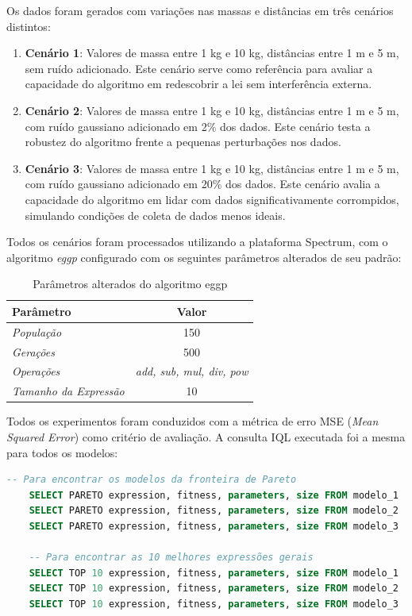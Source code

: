 Os dados foram gerados com variações nas massas e distâncias em três cenários distintos:
\begin{enumerate}
    \item \textbf{Cenário 1}: Valores de massa entre 1 kg e 10 kg, distâncias entre 1 m e 5 m, sem ruído adicionado. Este cenário serve como referência para avaliar a capacidade do algoritmo em redescobrir a lei sem interferência externa.
    \item \textbf{Cenário 2}: Valores de massa entre 1 kg e 10 kg, distâncias entre 1 m e 5 m, com ruído gaussiano adicionado em 2\% dos dados. Este cenário testa a robustez do algoritmo frente a pequenas perturbações nos dados.
    \item \textbf{Cenário 3}: Valores de massa entre 1 kg e 10 kg, distâncias entre 1 m e 5 m, com ruído gaussiano adicionado em 20\% dos dados. Este cenário avalia a capacidade do algoritmo em lidar com dados significativamente corrompidos, simulando condições de coleta de dados menos ideais.
\end{enumerate}

Todos os cenários foram processados utilizando a plataforma Spectrum, com o algoritmo \textit{eggp} configurado com os seguintes parâmetros alterados de seu padrão:
\begin{table}
    \centering
    \caption{Parâmetros alterados do algoritmo eggp}
    \label{tab:eggp_parameters}
    \begin{tabular}{lc}
        \toprule
        \textbf{Parâmetro} & \textbf{Valor} \\
        \midrule
        \textit{População} & 150 \\
        \textit{Gerações} & 500 \\
        \textit{Operações} & \textit{add, sub, mul, div, pow} \\
        \textit{Tamanho da Expressão} & 10 \\
    \end{tabular}
\end{table}

Todos os experimentos foram conduzidos com a métrica de erro MSE (\textit{Mean Squared Error}) como critério de avaliação. A consulta IQL executada foi a mesma para todos os modelos:
\begin{lstlisting}[language=SQL]
    -- Para encontrar os modelos da fronteira de Pareto
    SELECT PARETO expression, fitness, parameters, size FROM modelo_1
    SELECT PARETO expression, fitness, parameters, size FROM modelo_2
    SELECT PARETO expression, fitness, parameters, size FROM modelo_3

    -- Para encontrar as 10 melhores expressões gerais
    SELECT TOP 10 expression, fitness, parameters, size FROM modelo_1
    SELECT TOP 10 expression, fitness, parameters, size FROM modelo_2
    SELECT TOP 10 expression, fitness, parameters, size FROM modelo_3
\end{lstlisting}

